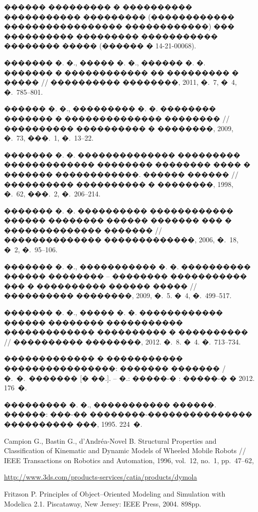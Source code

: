 \documentclass[12pt,a4paper]{article}
\begin{document}
������ ��������� � ���������� ����������� ��������� (������������ 
����������������� ������������) ��� ���������� ��������� �����������
�������� ����� (������ � 14-21-00068).

\bigskip
\bigskip

\begin{thebibliography}{99}

\Russian
{}
������� �. �., ����� �. �., ������ �. �. ������� � ������������ �� ��������� � 
����� // ���������� ��������, 2011, �.~7, �~4, �.~785--801.

������ �. �., ��������� �. �. �������� ������� � �������������� �������� // 
���������� ���������� � ��������, 2009, �.~73, ���.~1, �.~13--22.

������� �. �. �������������� ��������� ������������� �������� �������� ���� � 
������� ������������. ������ ������ // ���������� ���������� � ��������, 1998, 
�.~62, ���.~2, �.~206--214.

������� �. �. ���������� ������������ ������ �������� ������ ������� ��� � 
�������������� ������� // �������������� �������������, 2006, �.~18, �~2, 
�.~95--106.

������� �. �., ����������� �. �. ���������� ������ �������� -- �������� 
����������� ��� � ���������� ������ ����� // ���������� ��������, 2009, �.~5. 
�~4, �.~499--517.

������� �. �., ����� �. �. ������������ ������ �������� ����������� 
������������� ���������� � ���������� // ���������� ��������, 2012. �.~8. �~4. 
�.~713--734.

������������� � ����������� ����������������: ������� ������� / �.~�.~������� 
[� ��.]. -- �.: �����-� : �����-� � 2012. 176~�.

��������� �. �., ����������� ������. ������: ���-�� ��������-���������������
���������� ���, 1995. 224~�.

\English
{}
Campion G., Bastin G., d'Andr\'ea-Novel B. Structural Properties and 
Classification of Kinematic and Dynamic Models of Wheeled Mobile Robots // IEEE 
Transactions on Robotics and Automation, 1996, vol.~12, no.~1, pp.~47--62,

\url{http://www.3ds.com/products-services/catia/products/dymola}

Fritzson P. Principles of Object--Oriented Modeling and Simulation with 
Modelica 2.1. Piscataway, New Jersey: IEEE Press, 2004. 898pp.


\end{thebibliography}
\end{document}

